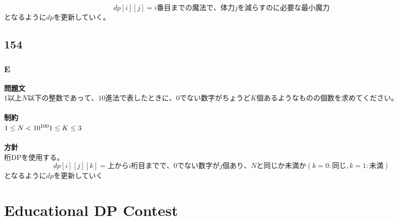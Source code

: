 \documentclass[a4paper]{jarticle}
\begin{document}
\[
dp[i][j]=i番目までの魔法で、体力jを減らすのに必要な最小魔力
\]
となるように$dp$を更新していく。



\hypertarget{154}{\subsection{154}}
\hypertarget{154e}{\subsubsection{E}}
\noindent
\textbf{問題文}\\
$1以上 N以下の整数であって、 10進法で表したときに、0でない数字がちょうど K個あるようなものの個数を求めてください。$
\\\\
\textbf{制約}\\
$1\le N<10^{100}\\
1\le K\le3$
\\\\
\textbf{方針}\\
桁DPを使用する。
\[
dp[i][j][k]=上からi桁目までで、0でない数字がj個あり、Nと同じか未満か(k=0:同じ,k=1:未満)
\]
となるように$dp$を更新していく

\newpage
\hypertarget{edcp}{\section{Educational DP Contest}}
\end{document}
